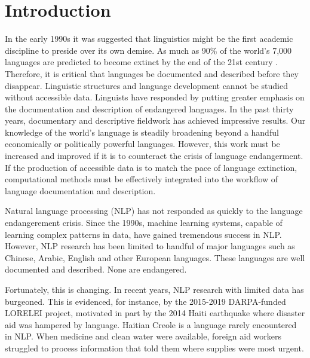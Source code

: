 \chapter{Introduction}
\label{introchap}

In the early 1990s it was suggested that linguistics might be the first academic discipline to preside over its own demise. As much as 90\% of the world’s 7,000 languages are predicted to become extinct by the end of the 21st century \citep{krauss_worlds_1992,krauss_keynote--mass_2007,campbell_new_2013}. Therefore, it is critical that languages  be documented and described before they disappear. %
Linguistic structures and language development cannot be studied without accessible data. Linguists have responded by putting greater emphasis on the documentation and description of endangered languages. In the past thirty years, documentary and descriptive fieldwork has achieved impressive results. Our knowledge of the world's language is steadily broadening beyond a handful economically or politically powerful languages. However, this work 
must be increased and improved if it is to counteract the crisis of language endangerment. 
If the production of accessible data is to match the pace of language extinction, computational methods must be effectively integrated into the workflow of language documentation and description. 

Natural language processing (NLP) has not responded as quickly to the language endangerement crisis. Since the 1990s, machine learning systems, capable of learning complex patterns in data, have gained tremendous success in NLP. 
However, NLP research has been limited to handful of major languages such as Chinese, Arabic, English and other European languages. These languages are well documented and described. None 
are endangered.%

Fortunately, this is changing. In recent years, NLP research with limited data has burgeoned. This is evidenced, for instance, by the 2015-2019 DARPA-funded LORELEI project, motivated in part by the 2014 Haiti earthquake where disaster aid was hampered by language. Haitian Creole is a language rarely encountered in NLP. When medicine and clean water were available, foreign aid workers struggled to process information that told them where supplies were most urgent. 

